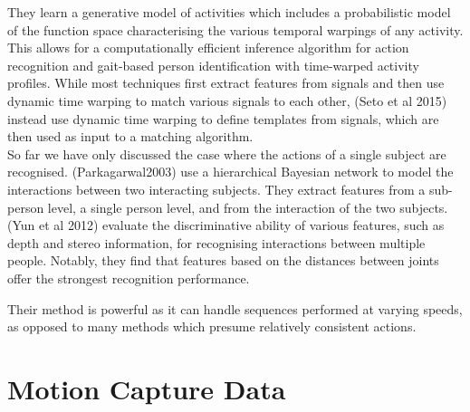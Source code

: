 They learn a generative model of activities which includes a probabilistic model of the function space characterising the various temporal warpings of any activity. This allows for a computationally efficient inference algorithm for action recognition and gait-based person identification with time-warped activity profiles. While most techniques first extract features from signals and then use dynamic time warping to match various signals to each other, (Seto et al 2015) instead use dynamic time warping to define templates from signals, which are then used as input to a matching algorithm. \\

So far we have only discussed the case where the actions of a single subject are recognised. (Parkagarwal2003) use a hierarchical Bayesian network to model the interactions between two interacting subjects. They extract features from a sub-person level, a single person level, and from the interaction of the two subjects. (Yun et al 2012) evaluate the discriminative ability of various features, such as depth and stereo information, for recognising interactions between multiple people. Notably, they find that features based on the distances between joints offer the strongest recognition performance. 


Their method is powerful as it can handle sequences performed at varying speeds, as opposed to many methods which presume relatively consistent actions.























\section{Motion Capture Data}

